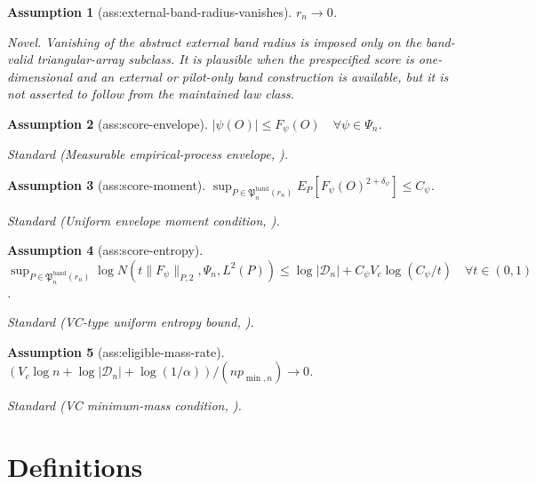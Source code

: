 \documentclass{article}
\newtheorem{assumption}{Assumption}
\begin{document}
\begin{assumption}[ass:external-band-radius-vanishes]\label{ass:external-band-radius-vanishes}
\(r_n\to0\).
\par\smallskip\noindent\emph{Novel.} Vanishing of the abstract external band radius is imposed only on the band-valid triangular-array subclass. It is plausible when the prespecified score is one-dimensional and an external or pilot-only band construction is available, but it is not asserted to follow from the maintained law class.
\end{assumption}

\begin{assumption}[ass:score-envelope]\label{ass:score-envelope}
\(|\psi(O)|\le F_\psi(O)\quad\forall\psi\in\Psi_n\).
\par\smallskip\noindent\emph{Standard} (Measurable empirical-process envelope, \cite{vanDerVaartWellner1996}).
\end{assumption}

\begin{assumption}[ass:score-moment]\label{ass:score-moment}
\(\sup_{P\in\mathfrak P_n^{\mathrm{band}}(r_n)}E_P[F_\psi(O)^{2+\delta_\psi}]\le C_\psi\).
\par\smallskip\noindent\emph{Standard} (Uniform envelope moment condition, \cite{vanDerVaartWellner1996}).
\end{assumption}

\begin{assumption}[ass:score-entropy]\label{ass:score-entropy}
\(\sup_{P\in\mathfrak P_n^{\mathrm{band}}(r_n)}\log N(t\|F_\psi\|_{P,2},\Psi_n,L^2(P))\le\log|\mathcal D_n|+C_\psi V_c\log(C_\psi/t)\quad\forall t\in(0,1)\).
\par\smallskip\noindent\emph{Standard} (VC-type uniform entropy bound, \cite{vanDerVaartWellner1996}).
\end{assumption}

\begin{assumption}[ass:eligible-mass-rate]\label{ass:eligible-mass-rate}
\((V_c\log n+\log|\mathcal D_n|+\log(1/\alpha))/(np_{\min,n})\to0\).
\par\smallskip\noindent\emph{Standard} (VC minimum-mass condition, \cite{vanDerVaartWellner1996}).
\end{assumption}

\section{Definitions}
\end{document}
